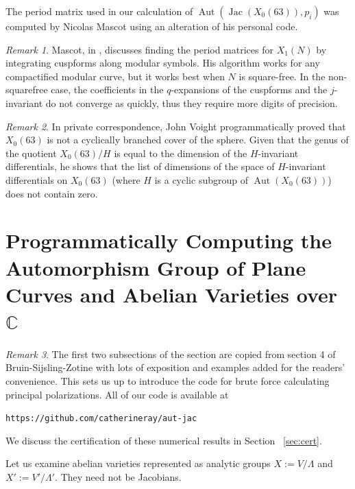 \documentclass[12pt,reqno]{amsart}
\DeclareMathOperator{\Aut}{Aut}
\DeclareMathOperator{\Jac}{Jac}
\theoremstyle{definition}
\theoremstyle{remark}
\newtheorem*{remark}{Remark}
\begin{document}
\vspace{+10pt} 
The period matrix used in our calculation of $\Aut(\Jac(X_0(63)), p_i)$ was computed by Nicolas Mascot using an alteration of his personal code.

\begin{remark} Mascot, in \cite{n}, discusses finding the period matrices for $X_1(N)$ by integrating cuspforms along modular symbols. His algorithm works for any compactified modular curve, but it works best when $N$ is square-free. In the non-squarefree case, the coefficients in the $q$-expansions of the cuspforms and the $j$-invariant do not converge as quickly, thus they require more digits of precision. \end{remark}

\begin{remark} In private correspondence, John Voight programmatically proved that $X_0(63)$ is not a cyclically branched cover of the sphere. Given that the genus of the quotient $X_0(63)/H$ is equal to the dimension of the $H$-invariant differentials, he shows that the list of dimensions of the space of $H$-invariant differentials on $X_0(63)$ (where $H$ is a cyclic subgroup of $\Aut(X_0(63))$) does not contain zero. 
 \end{remark} 





 \section{Programmatically Computing the Automorphism Group of Plane Curves and Abelian Varieties over $\mathbb{C}$}

\label{sec:computing}

\begin{remark} The first two subsections of the section are copied from section 4 of Bruin-Sijsling-Zotine \cite{numerical} with lots of exposition and examples added for the readers' convenience. This sets us up to introduce the code for brute force calculating principal polarizations. All of our code is available at \begin{center}\texttt{https://github.com/catherineray/aut-jac}\end{center} We discuss the certification of these numerical results in Section ~\ref{sec:cert}. \end{remark} 

Let us examine abelian varieties represented as analytic groups $X := V/\Lambda$ and $X' := V'/\Lambda'$. They need not be Jacobians.
\end{document}
